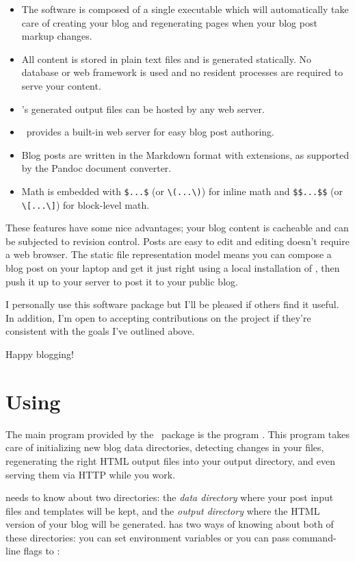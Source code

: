 \documentclass[11pt, letterpaper, oneside, titlepage]{book}
\begin{document}
\begin{itemize}
\item{The software is composed of a single executable which will
  automatically take care of creating your blog and regenerating pages
  when your blog post markup changes.}
\item{All content is stored in plain text files and is generated
  statically.  No database or web framework is used and no resident
  processes are required to serve your content.}
\item{\mathblog's generated output files can be hosted by any web
  server.}
\item{\mathblog\ provides a built-in web server for easy blog post
  authoring.}
\item{Blog posts are written in the Markdown format with extensions,
  as supported by the Pandoc document converter.}
\item{Math is embedded with \verb|$...$| (or \verb|\(...\)|) for inline math
	and \verb|$$...$$| (or \verb|\[...\]|) for block-level math.}
\end{itemize}

These features have some nice advantages; your blog content is
cacheable and can be subjected to revision control.  Posts are easy to
edit and editing doesn't require a web browser.  The static file
representation model means you can compose a blog post on your laptop
and get it just right using a local installation of \mathblog, then
push it up to your server to post it to your public blog.

I personally use this software package but I'll be pleased if others
find it useful.  In addition, I'm open to accepting contributions on
the project if they're consistent with the goals I've outlined above.

Happy blogging!

\chapter{Using \mathblog}

The main program provided by the \mathblog\ package is the program
.  This program takes care of initializing new blog data
directories, detecting changes in your files, regenerating the right
HTML output files into your output directory, and even serving them
via HTTP while you work.

 needs to know about two directories: the \textit{data
  directory} where your post input files and templates will be kept,
and the \textit{output directory} where the HTML version of your blog
will be generated.   has two ways of knowing about both of
these directories: you can set environment variables or you can pass
command-line flags to :
\end{document}
